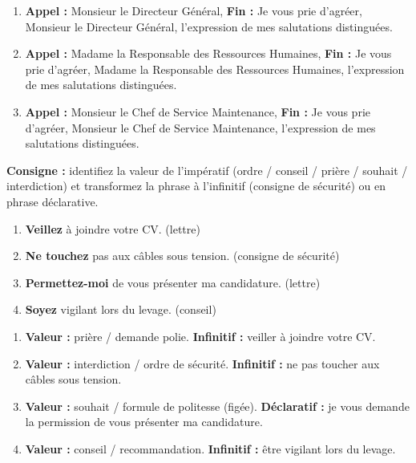 \documentclass[11pt]{article}
\begin{document}
\begin{corrige}
\begin{enumerate}
\item \textbf{Appel :} Monsieur le Directeur Général, \quad \textbf{Fin :} \og Je vous prie d'agréer, Monsieur le Directeur Général, l'expression de mes salutations distinguées.\fg
\item \textbf{Appel :} Madame la Responsable des Ressources Humaines, \quad \textbf{Fin :} \og Je vous prie d'agréer, Madame la Responsable des Ressources Humaines, l'expression de mes salutations distinguées.\fg
\item \textbf{Appel :} Monsieur le Chef de Service Maintenance, \quad \textbf{Fin :} \og Je vous prie d'agréer, Monsieur le Chef de Service Maintenance, l'expression de mes salutations distinguées.\fg
\end{enumerate}
\end{corrige}

\begin{exercice}
\textbf{Consigne :} identifiez la valeur de l'impératif (ordre / conseil / prière / souhait / interdiction) et transformez la phrase à l'infinitif (consigne de sécurité) ou en phrase déclarative.
\begin{enumerate}
\item \og \textbf{Veillez} à joindre votre CV.\fg{} (lettre)
\item \og \textbf{Ne touchez} pas aux câbles sous tension.\fg{} (consigne de sécurité)
\item \og \textbf{Permettez-moi} de vous présenter ma candidature.\fg{} (lettre)
\item \og \textbf{Soyez} vigilant lors du levage.\fg{} (conseil)
\end{enumerate}
\end{exercice}

\begin{corrige}
\begin{enumerate}
\item \textbf{Valeur :} prière / demande polie. \textbf{Infinitif :} veiller à joindre votre CV.
\item \textbf{Valeur :} interdiction / ordre de sécurité. \textbf{Infinitif :} ne pas toucher aux câbles sous tension.
\item \textbf{Valeur :} souhait / formule de politesse (figée). \textbf{Déclaratif :} je vous demande la permission de vous présenter ma candidature.
\item \textbf{Valeur :} conseil / recommandation. \textbf{Infinitif :} être vigilant lors du levage.
\end{enumerate}
\end{corrige}
\end{document}
